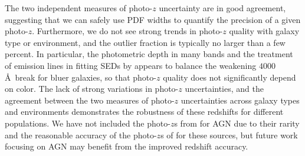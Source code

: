 The two independent measures of photo-$z$
uncertainty are in good agreement, suggesting that we can safely use
PDF widths to quantify the precision of a given photo-$z$. Furthermore,
we do not see strong trends in photo-$z$ quality with galaxy type or
environment, and the outlier fraction is typically no larger than a
few percent. In particular, the photometric depth in many bands and 
the treatment of emission lines in fitting SEDs by
\citet{Ilbert2009} appears to balance the weakening $4000$\AA\ break
for bluer galaxies, so that photo-$z$ quality does not significantly
depend on color. The lack of strong variations in photo-$z$ uncertainties, and 
the agreement between the two measures of photo-$z$ uncertainties across
galaxy types and environments demonstrates the robustness of these
redshifts for different populations. We have not included the photo-$z$s
from \citet{Salvato2009} for AGN due to their rarity and the reasonable
accuracy of the photo-$z$s of \citet{Ilbert2009} for these sources, but
future work focusing on AGN may benefit from the improved redshift
accuracy.

